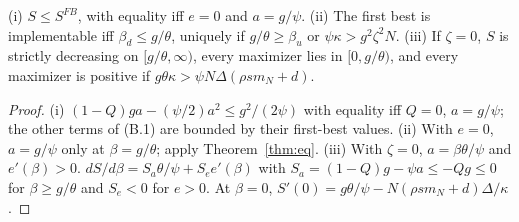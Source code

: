 \documentclass[acmsmall,screen,review]{acmart}
\theoremstyle{acmdefinition}
\begin{document}
\begin{theorem}\label{thm:pay}
(i) $S \le S^{FB}$, with equality iff $e = 0$ and $a = g/\psi$. (ii) The first best is implementable iff $\beta_d \le g/\theta$, uniquely if $g/\theta \ge \beta_u$ or $\psi\kappa > g^2\zeta^2N$. (iii) If $\zeta = 0$, $S$ is strictly decreasing on $[g/\theta,\infty)$, every maximizer lies in $[0, g/\theta)$, and every maximizer is positive if $g\theta\kappa > \psi N\Delta(\rho s m_N + d)$.
\end{theorem}
\begin{proof}
(i) $(1-Q)ga - (\psi/2)a^2 \le g^2/(2\psi)$ with equality iff $Q = 0$, $a = g/\psi$; the other terms of (B.1) are bounded by their first-best values. (ii) With $e = 0$, $a = g/\psi$ only at $\beta = g/\theta$; apply Theorem~\ref{thm:eq}. (iii) With $\zeta = 0$, $a = \beta\theta/\psi$ and $e'(\beta) > 0$. $dS/d\beta = S_a\theta/\psi + S_e e'(\beta)$ with $S_a = (1-Q)g - \psi a \le -Qg \le 0$ for $\beta \ge g/\theta$ and $S_e < 0$ for $e > 0$. At $\beta = 0$, $S'(0) = g\theta/\psi - N(\rho s m_N + d)\Delta/\kappa$.
\end{proof}
\end{document}
